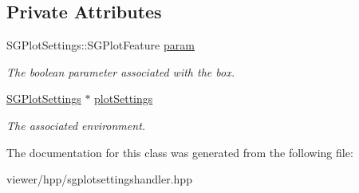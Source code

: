 \subsection*{Private Attributes}
\begin{DoxyCompactItemize}
\item 
\mbox{\label{classSGPlotFeatureBox_a9228a3418fd2722bd897ce99553c4f64}} 
S\+G\+Plot\+Settings\+::\+S\+G\+Plot\+Feature \hyperlink{classSGPlotFeatureBox_a9228a3418fd2722bd897ce99553c4f64}{param}
\begin{DoxyCompactList}\small\item\em The boolean parameter associated with the box. \end{DoxyCompactList}\item 
\mbox{\label{classSGPlotFeatureBox_a0721c9e7fc91fc018aac809bd85bfb81}} 
\hyperlink{classSGPlotSettings}{S\+G\+Plot\+Settings} $\ast$ \hyperlink{classSGPlotFeatureBox_a0721c9e7fc91fc018aac809bd85bfb81}{plot\+Settings}
\begin{DoxyCompactList}\small\item\em The associated environment. \end{DoxyCompactList}\end{DoxyCompactItemize}


The documentation for this class was generated from the following file\+:\begin{DoxyCompactItemize}
\item 
viewer/hpp/sgplotsettingshandler.\+hpp\end{DoxyCompactItemize}
